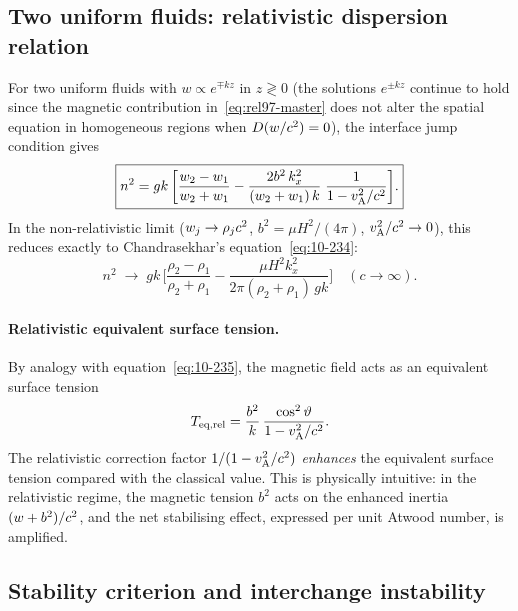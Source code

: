 \subsection{Two uniform fluids: relativistic dispersion relation}

For two uniform fluids with $w\propto e^{\mp kz}$ in $z\gtrless 0$
(the solutions $e^{\pm kz}$ continue to hold since the magnetic
contribution in~\eqref{eq:rel97-master} does not alter the spatial
equation in homogeneous regions when $D(w/c^{2})=0$), the
interface jump condition gives
\begin{equation}
  \boxed{%
  n^{2}
    = gk\,\biggl[
        \frac{\enthalpy_{2}-\enthalpy_{1}}{\enthalpy_{2}+\enthalpy_{1}}
        - \frac{2b^{2}\,k_{x}^{2}}{(\enthalpy_{2}+\enthalpy_{1})\,k}
          \;\frac{1}{1-\vA^{2}/c^{2}}
      \biggr].}
  \label{eq:rel97-dispersion}
\end{equation}
In the non-relativistic limit ($w_{j}\to\rho_{j}c^{2}$,
$b^{2}=\mu H^{2}/(4\pi)$, $v_{\mathrm{A}}^{2}/c^{2}\to0$), this reduces exactly
to Chandrasekhar's equation~\eqref{eq:10-234}:
\begin{equation}
  n^{2}\;\longrightarrow\;
  gk\,\biggl[\frac{\rho_{2}-\rho_{1}}{\rho_{2}+\rho_{1}}
    - \frac{\mu H^{2}k_{x}^{2}}{2\pi(\rho_{2}+\rho_{1})\,gk}\biggr]
  \quad(c\to\infty).
  \label{eq:rel97-NR-limit}
\end{equation}

\paragraph{Relativistic equivalent surface tension.}
By analogy with equation~\eqref{eq:10-235}, the magnetic field acts as
an equivalent surface tension
\begin{equation}
  T_{\text{eq,rel}}
    = \frac{b^{2}}{k}\,\frac{\cos^{2}\vartheta}{1-v_{\mathrm{A}}^{2}/c^{2}}.
  \label{eq:rel97-Teq}
\end{equation}
The relativistic correction factor $1/(1-v_{\mathrm{A}}^{2}/c^{2})$ \emph{enhances}
the equivalent surface tension compared with the classical value.  This
is physically intuitive: in the relativistic regime, the magnetic
tension $b^{2}$ acts on the enhanced inertia
$(w+b^{2})/c^{2}$, and the net stabilising effect, expressed per
unit Atwood number, is amplified.

\subsection{Stability criterion and interchange instability}

